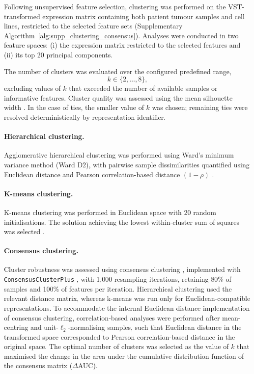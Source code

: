 Following unsupervised feature selection, clustering was performed on the
VST-transformed expression matrix containing both patient tumour samples and
cell lines, restricted to the selected feature sets (Supplementary
Algorithm~\ref{alg:supp_clustering_consensus}). Analyses were conducted in two
feature spaces: (i) the expression matrix restricted to the selected features
and (ii) its top 20 principal components.

The number of clusters was evaluated over the configured predefined range,
\[
k \in \{2, \ldots, 8\},
\]
excluding values of \(k\) that exceeded the number of available samples or
informative features. Cluster quality was assessed using the mean silhouette width
\citep{Rousseeuw1987Silhouette}.
In the case of ties, the smaller
value of \(k\) was chosen; remaining ties were resolved deterministically by
representation identifier.

\paragraph{Hierarchical clustering.}
Agglomerative hierarchical clustering was performed using Ward's minimum variance method (Ward D2), with pairwise sample dissimilarities quantified using Euclidean distance and Pearson correlation-based distance \((1-\rho)\) \citep{BertholdHoeppner2006}.

\paragraph{K-means clustering.}
K-means clustering was performed in Euclidean space with 20 random initialisations. The solution achieving the lowest within-cluster sum of squares was selected \citep{MacQueen1967}.

\paragraph{Consensus clustering.}
Cluster robustness was assessed using consensus clustering \citep{Monti2003ConsensusClustering}, implemented with \texttt{ConsensusClusterPlus} \citep{Wilkerson2010ConsensusClusterPlus}, with 1{,}000 resampling iterations, retaining 80\% of samples and 100\% of features per iteration. Hierarchical clustering used the relevant distance matrix, whereas k-means was run only for Euclidean-compatible representations. To accommodate the internal Euclidean distance implementation of consensus clustering, correlation-based analyses were performed after mean-centring and unit-\(\ell_2\)-normalising samples, such that Euclidean distance in the transformed space corresponded to Pearson correlation-based distance in the original space. The optimal number of clusters was selected as the value of \(k\) that maximised the change in the area under the cumulative distribution function of the consensus matrix (\(\Delta\)AUC).

